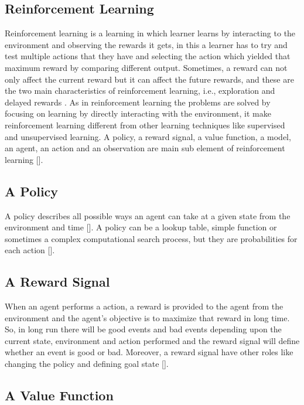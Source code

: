 \documentclass[12pt]{article}
\begin{document}
\subsection{Reinforcement Learning}

Reinforcement learning is a learning in which learner learns by interacting to the environment and observing the rewards it gets, in this a learner has to try and test multiple actions that they have and selecting the action which yielded that maximum reward by comparing different output. Sometimes, a reward can not only affect the current reward but it can affect the future rewards, and these are the two main characteristics of reinforcement learning, i.e., exploration and delayed rewards \cite{Sutton_Barto_2020}. As in reinforcement learning the problems are solved by focusing on learning by directly interacting with the environment, it make reinforcement learning different from other learning techniques like supervised and unsupervised learning. A policy, a reward signal, a value function, a model, an agent, an action and an observation are main sub element of reinforcement learning [\cite{Sutton_Barto_2020}].

\subsection{A Policy}

A policy describes all possible ways an agent can take at a given state from the environment and time [\cite{Sutton_Barto_2020}]. A policy can be a lookup table, simple function or sometimes a complex computational search process, but they are probabilities for each action [\cite{Sutton_Barto_2020}].

\subsection{A Reward Signal}

When an agent performs a action, a reward is provided to the agent from the environment and the agent's objective is to maximize that reward in long time. So, in long run there will be good events and bad events depending upon the current state, environment and action performed and the reward signal will define whether an event is good or bad. Moreover, a reward signal have other roles like changing the policy and defining goal state [\cite{Sutton_Barto_2020}].

\subsection{A Value Function}
\end{document}
